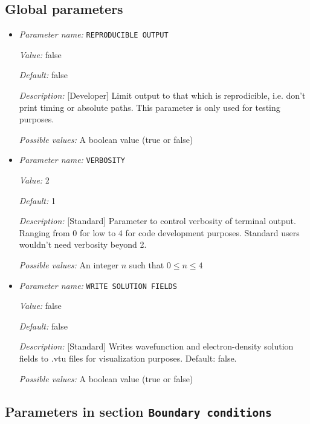 \subsection{Global parameters}
\label{parameters:global}


\begin{itemize}
\item {\it Parameter name:} {\tt REPRODUCIBLE OUTPUT}
\label{parameters:REPRODUCIBLE OUTPUT}
\label{parameters:REPRODUCIBLE_20OUTPUT}


{\it Value:} false


{\it Default:} false


{\it Description:} [Developer] Limit output to that which is reprodicible, i.e. don't print timing or absolute paths. This parameter is only used for testing purposes.


{\it Possible values:} A boolean value (true or false)
\item {\it Parameter name:} {\tt VERBOSITY}
\label{parameters:VERBOSITY}


{\it Value:} 2


{\it Default:} 1


{\it Description:} [Standard] Parameter to control verbosity of terminal output. Ranging from 0 for low to 4 for code development purposes. Standard users wouldn't need verbosity beyond 2.


{\it Possible values:} An integer $n$ such that $0\leq n \leq 4$
\item {\it Parameter name:} {\tt WRITE SOLUTION FIELDS}
\label{parameters:WRITE SOLUTION FIELDS}
\label{parameters:WRITE_20SOLUTION_20FIELDS}


{\it Value:} false


{\it Default:} false


{\it Description:} [Standard] Writes wavefunction and electron-density solution fields to .vtu files for visualization purposes. Default: false.


{\it Possible values:} A boolean value (true or false)
\end{itemize}



\subsection{Parameters in section \tt Boundary conditions}
\label{parameters:Boundary_20conditions}

